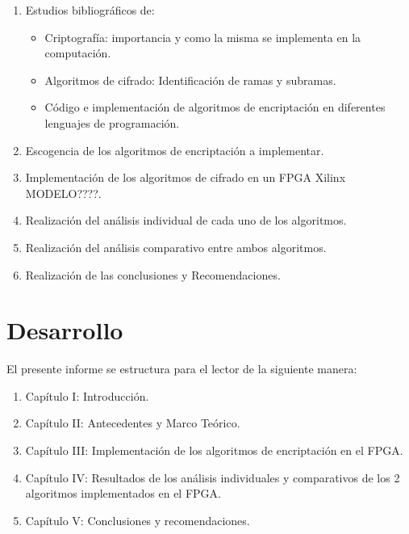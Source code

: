 \begin{enumerate}

\item Estudios bibliográficos de:

\begin{itemize}
	\item Criptografía: importancia y como la misma se implementa en la computación.
	\item Algoritmos de cifrado: Identificación de ramas y subramas.
	\item Código e implementación de algoritmos de encriptación en diferentes lenguajes de programación.
\end{itemize}

\item Escogencia de los algoritmos de encriptación a implementar.

\item Implementación de los algoritmos de cifrado en un FPGA Xilinx MODELO????.

\item Realización del análisis individual de cada uno de los algoritmos.

\item Realización del análisis comparativo entre ambos algoritmos.

\item Realización de las conclusiones y Recomendaciones.

\end{enumerate}

\section{Desarrollo}

El presente informe se estructura para el lector de la siguiente manera:

\begin{enumerate}
\item Capítulo I: Introducción.

\item Capítulo II: Antecedentes y Marco Teórico. 

\item Capítulo III: Implementación de los algoritmos de encriptación en el FPGA.

\item Capítulo IV: Resultados de los análisis individuales y comparativos de los 2 algoritmos implementados en el FPGA.

\item Capítulo V: Conclusiones y recomendaciones.

\end{enumerate}